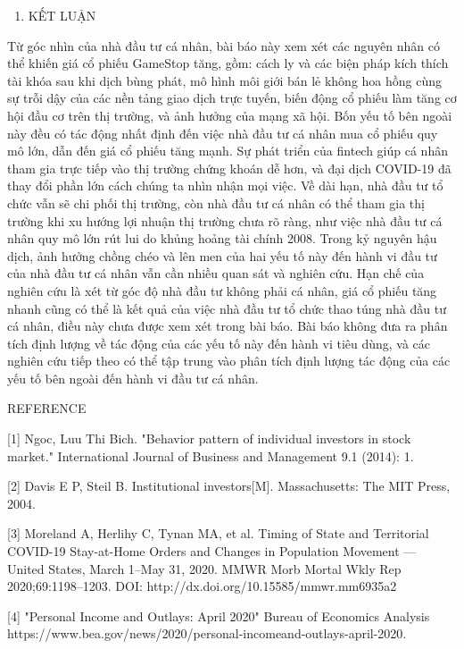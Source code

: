 \begin{enumerate}
\def\labelenumi{\arabic{enumi}.}
\setcounter{enumi}{3}
\item
  KẾT LUẬN
\end{enumerate}

Từ góc nhìn của nhà đầu tư cá nhân, bài báo này xem xét các nguyên nhân có thể khiến giá cổ phiếu GameStop tăng, gồm: cách ly và các biện pháp kích thích tài khóa sau khi dịch bùng phát, mô hình môi giới bán lẻ không hoa hồng cùng sự trỗi dậy của các nền tảng giao dịch trực tuyến, biến động cổ phiếu làm tăng cơ hội đầu cơ trên thị trường, và ảnh hưởng của mạng xã hội. Bốn yếu tố bên ngoài này đều có tác động nhất định đến việc nhà đầu tư cá nhân mua cổ phiếu quy mô lớn, dẫn đến giá cổ phiếu tăng mạnh. Sự phát triển của fintech giúp cá nhân tham gia trực tiếp vào thị trường chứng khoán dễ hơn, và đại dịch COVID-19 đã thay đổi phần lớn cách chúng ta nhìn nhận mọi việc. Về dài hạn, nhà đầu tư tổ chức vẫn sẽ chi phối thị trường, còn nhà đầu tư cá nhân có thể tham gia thị trường khi xu hướng lợi nhuận thị trường chưa rõ ràng, như việc nhà đầu tư cá nhân quy mô lớn rút lui do khủng hoảng tài chính 2008. Trong kỷ nguyên hậu dịch, ảnh hưởng chồng chéo và lên men của hai yếu tố này đến hành vi đầu tư của nhà đầu tư cá nhân vẫn cần nhiều quan sát và nghiên cứu. Hạn chế của nghiên cứu là xét từ góc độ nhà đầu tư không phải cá nhân, giá cổ phiếu tăng nhanh cũng có thể là kết quả của việc nhà đầu tư tổ chức thao túng nhà đầu tư cá nhân, điều này chưa được xem xét trong bài báo. Bài báo không đưa ra phân tích định lượng về tác động của các yếu tố này đến hành vi tiêu dùng, và các nghiên cứu tiếp theo có thể tập trung vào phân tích định lượng tác động của các yếu tố bên ngoài đến hành vi đầu tư cá nhân.

REFERENCE

{[}1{]} Ngoc, Luu Thi Bich. "Behavior pattern of individual investors in stock market." International Journal of Business and Management 9.1 (2014): 1.

{[}2{]} Davis E P, Steil B. Institutional investors{[}M{]}. Massachusetts: The MIT Press, 2004.

{[}3{]} Moreland A, Herlihy C, Tynan MA, et al. Timing of State and Territorial COVID-19 Stay-at-Home Orders and Changes in Population Movement --- United States, March 1--May 31, 2020. MMWR Morb Mortal Wkly Rep 2020;69:1198--1203. DOI: http://dx.doi.org/10.15585/mmwr.mm6935a2

{[}4{]} "Personal Income and Outlays: April 2020" Bureau of Economics Analysis https://www.bea.gov/news/2020/personal-incomeand-outlays-april-2020.

